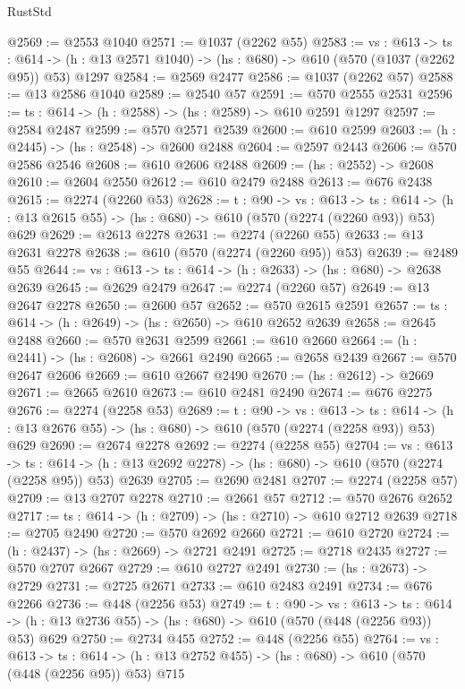 \begin{lexlean}{RustStd}
\begin{coremodule}
@2569 := @2553 @1040
@2571 := @1037 (@2262 @55)
@2583 := {vs : @613} ->
  {ts : @614} -> (h : @13 @2571 @1040) -> (hs : @680) -> @610 (@570 (@1037 (@2262 @95)) @53) @1297
@2584 := @2569 @2477
@2586 := @1037 (@2262 @57)
@2588 := @13 @2586 @1040
@2589 := @2540 @57
@2591 := @570 @2555 @2531
@2596 := {ts : @614} -> (h : @2588) -> (hs : @2589) -> @610 @2591 @1297
@2597 := @2584 @2487
@2599 := @570 @2571 @2539
@2600 := @610 @2599
@2603 := (h : @2445) -> (hs : @2548) -> @2600 @2488
@2604 := @2597 @2443
@2606 := @570 @2586 @2546
@2608 := @610 @2606 @2488
@2609 := (hs : @2552) -> @2608
@2610 := @2604 @2550
@2612 := @610 @2479 @2488
@2613 := @676 @2438
@2615 := @2274 (@2260 @53)
@2628 := {t : @90} ->
  {vs : @613} ->
  {ts : @614} -> (h : @13 @2615 @55) -> (hs : @680) -> @610 (@570 (@2274 (@2260 @93)) @53) @629
@2629 := @2613 @2278
@2631 := @2274 (@2260 @55)
@2633 := @13 @2631 @2278
@2638 := @610 (@570 (@2274 (@2260 @95)) @53)
@2639 := @2489 @55
@2644 := {vs : @613} -> {ts : @614} -> (h : @2633) -> (hs : @680) -> @2638 @2639
@2645 := @2629 @2479
@2647 := @2274 (@2260 @57)
@2649 := @13 @2647 @2278
@2650 := @2600 @57
@2652 := @570 @2615 @2591
@2657 := {ts : @614} -> (h : @2649) -> (hs : @2650) -> @610 @2652 @2639
@2658 := @2645 @2488
@2660 := @570 @2631 @2599
@2661 := @610 @2660
@2664 := (h : @2441) -> (hs : @2608) -> @2661 @2490
@2665 := @2658 @2439
@2667 := @570 @2647 @2606
@2669 := @610 @2667 @2490
@2670 := (hs : @2612) -> @2669
@2671 := @2665 @2610
@2673 := @610 @2481 @2490
@2674 := @676 @2275
@2676 := @2274 (@2258 @53)
@2689 := {t : @90} ->
  {vs : @613} ->
  {ts : @614} -> (h : @13 @2676 @55) -> (hs : @680) -> @610 (@570 (@2274 (@2258 @93)) @53) @629
@2690 := @2674 @2278
@2692 := @2274 (@2258 @55)
@2704 := {vs : @613} ->
  {ts : @614} -> (h : @13 @2692 @2278) -> (hs : @680) -> @610 (@570 (@2274 (@2258 @95)) @53) @2639
@2705 := @2690 @2481
@2707 := @2274 (@2258 @57)
@2709 := @13 @2707 @2278
@2710 := @2661 @57
@2712 := @570 @2676 @2652
@2717 := {ts : @614} -> (h : @2709) -> (hs : @2710) -> @610 @2712 @2639
@2718 := @2705 @2490
@2720 := @570 @2692 @2660
@2721 := @610 @2720
@2724 := (h : @2437) -> (hs : @2669) -> @2721 @2491
@2725 := @2718 @2435
@2727 := @570 @2707 @2667
@2729 := @610 @2727 @2491
@2730 := (hs : @2673) -> @2729
@2731 := @2725 @2671
@2733 := @610 @2483 @2491
@2734 := @676 @2266
@2736 := @448 (@2256 @53)
@2749 := {t : @90} ->
  {vs : @613} ->
  {ts : @614} -> (h : @13 @2736 @55) -> (hs : @680) -> @610 (@570 (@448 (@2256 @93)) @53) @629
@2750 := @2734 @455
@2752 := @448 (@2256 @55)
@2764 := {vs : @613} ->
  {ts : @614} -> (h : @13 @2752 @455) -> (hs : @680) -> @610 (@570 (@448 (@2256 @95)) @53) @715

\end{coremodule}
\end{lexlean}

